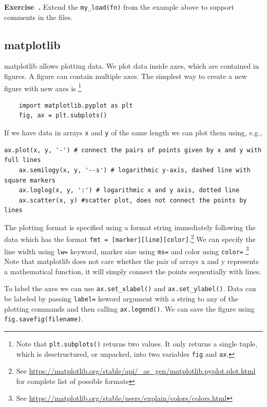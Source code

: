 \documentclass{article}
\newcommand{\ls}[1]{\lstinline{#1}}
\newcounter{exercise}
\newenvironment{exercise}[1][]%
    {\refstepcounter{exercise}%
    \begin{mdframed}[backgroundcolor=exercise,linecolor=white]%
    \textbf{Exercise~\theexercise.} #1 \rmfamily}%
    {\medskip\end{mdframed}}
\begin{document}
\begin{exercise}
    Extend the \lstinline{my_load(fn)} from the example above to support comments in the files.
\end{exercise}

\subsection{matplotlib}

matplotlib allows plotting data. We plot data inside axes, which are contained in figures. A figure can contain multiple axes. The simplest way to create a new figure with new axes is \footnote{Note that \lstinline{plt.subplots()} returns two values. It only returns a single tuple, which is desctructured, or unpacked, into two variables \lstinline{fig} and \lstinline{ax}.}
\begin{lstlisting}
    import matplotlib.pyplot as plt
    fig, ax = plt.subplots()
\end{lstlisting}
If we have data in arrays \lstinline{x} and \lstinline{y} of the same length we can plot them using, e.g., 
\begin{lstlisting}[caption=Basic plotting.]
    ax.plot(x, y, '-') # connect the pairs of points given by x and y with full lines
    ax.semilogy(x, y, '--s') # logarithmic y-axis, dashed line with square markers
    ax.loglog(x, y, ':') # logarithmic x and y axis, dotted line
    ax.scatter(x, y) #scatter plot, does not connect the points by lines
\end{lstlisting}
The plotting format is specified using a format string immediately following the data which has the format \ls{fmt = [marker][line][color]}.\footnote{See \url{https://matplotlib.org/stable/api/_as_gen/matplotlib.pyplot.plot.html} for complete list of possible formats} We can specify the line width using \ls{lw=} keyword, marker size using \ls{ms=} and color using \ls{color=} \footnote{See \url{https://matplotlib.org/stable/users/explain/colors/colors.html}} Note that matplotlib does not care whether the pair of arrays x and y represents a mathematical function, it will simply connect the points sequentially with lines.

To label the axes we can use \ls{ax.set_xlabel()} and \ls{ax.set_ylabel()}. Data can be labeled by passing \ls{label=} keword argument with a string to any of the plotting commands and then calling \ls{ax.legend()}. We can save the figure using \ls{fig.savefig(filename)}.
\end{document}
